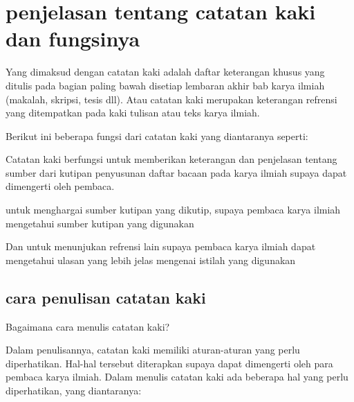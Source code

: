 
\vspace{\baselineskip}
\section{penjelasan tentang catatan kaki dan fungsinya}

\vspace{\baselineskip}
Yang dimaksud dengan catatan kaki adalah daftar keterangan khusus yang ditulis pada bagian paling bawah disetiap lembaran akhir bab karya ilmiah (makalah, skripsi, tesis dll). Atau catatan kaki merupakan keterangan refrensi yang ditempatkan pada kaki tulisan atau teks karya ilmiah.\par

\vspace{\baselineskip}
Berikut ini beberapa fungsi dari catatan kaki yang diantaranya seperti:\par


\vspace{\baselineskip}
\noindent Catatan kaki berfungsi untuk memberikan keterangan dan penjelasan tentang sumber dari kutipan penyusunan daftar bacaan pada karya ilmiah supaya dapat dimengerti oleh pembaca.\par

\vspace{\baselineskip}
\noindent untuk menghargai sumber kutipan yang dikutip, supaya pembaca karya ilmiah mengetahui sumber kutipan yang digunakan\par

\vspace{\baselineskip}
\noindent Dan untuk menunjukan refrensi lain supaya pembaca karya ilmiah dapat mengetahui ulasan yang lebih jelas mengenai istilah yang digunakan\par

\vspace{\baselineskip}
\subsection{cara penulisan catatan kaki}

\vspace{\baselineskip}
\noindent Bagaimana cara menulis catatan kaki?\par

\vspace{\baselineskip}
Dalam penulisannya, catatan kaki memiliki aturan-aturan yang perlu diperhatikan. Hal-hal tersebut diterapkan supaya dapat dimengerti oleh para pembaca karya ilmiah. Dalam menulis catatan kaki ada beberapa hal yang perlu diperhatikan, yang diantaranya:\par

